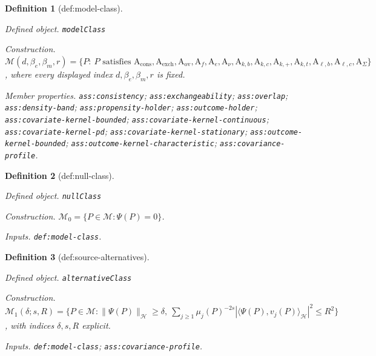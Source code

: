 \documentclass{article}
\newtheorem{definition}{Definition}
\begin{document}
\begin{definition}[def:model-class]\label{def:model-class}
\par\smallskip\noindent\emph{Defined object.} \texttt{modelClass}
\par\smallskip\noindent\emph{Construction.} \(\mathcal M(d,\beta_e,\beta_m,r)=\{P:\ P\text{ satisfies }\mathrm{A}_{\mathrm{cons}},\mathrm{A}_{\mathrm{exch}},\mathrm{A}_{\mathrm{ov}},\mathrm{A}_{f},\mathrm{A}_{e},\mathrm{A}_{\nu},\mathrm{A}_{k,b},\mathrm{A}_{k,c},\mathrm{A}_{k,+},\mathrm{A}_{k,t},\mathrm{A}_{\ell,b},\mathrm{A}_{\ell,c},\mathrm{A}_{\Sigma}\}\), where every displayed index \(d,\beta_e,\beta_m,r\) is fixed.
\par\smallskip\noindent\emph{Member properties.} \texttt{ass:\allowbreak{}consistency}; \texttt{ass:\allowbreak{}exchangeability}; \texttt{ass:\allowbreak{}overlap}; \texttt{ass:\allowbreak{}density-\allowbreak{}band}; \texttt{ass:\allowbreak{}propensity-\allowbreak{}holder}; \texttt{ass:\allowbreak{}outcome-\allowbreak{}holder}; \texttt{ass:\allowbreak{}covariate-\allowbreak{}kernel-\allowbreak{}bounded}; \texttt{ass:\allowbreak{}covariate-\allowbreak{}kernel-\allowbreak{}continuous}; \texttt{ass:\allowbreak{}covariate-\allowbreak{}kernel-\allowbreak{}pd}; \texttt{ass:\allowbreak{}covariate-\allowbreak{}kernel-\allowbreak{}stationary}; \texttt{ass:\allowbreak{}outcome-\allowbreak{}kernel-\allowbreak{}bounded}; \texttt{ass:\allowbreak{}outcome-\allowbreak{}kernel-\allowbreak{}characteristic}; \texttt{ass:\allowbreak{}covariance-\allowbreak{}profile}.
\end{definition}

\begin{definition}[def:null-class]\label{def:null-class}
\par\smallskip\noindent\emph{Defined object.} \texttt{nullClass}
\par\smallskip\noindent\emph{Construction.} \(\mathcal M_0=\{P\in\mathcal M:\Psi(P)=0\}\).
\par\smallskip\noindent\emph{Inputs.} \texttt{def:\allowbreak{}model-\allowbreak{}class}.
\end{definition}

\begin{definition}[def:source-alternatives]\label{def:source-alternatives}
\par\smallskip\noindent\emph{Defined object.} \texttt{alternativeClass}
\par\smallskip\noindent\emph{Construction.} \(\mathcal M_1(\delta;s,R)=\{P\in\mathcal M:\|\Psi(P)\|_{\mathcal H}\ge\delta,\ \sum_{j\ge1}\mu_j(P)^{-2s}|\langle\Psi(P),v_j(P)\rangle_{\mathcal H}|^2\le R^2\}\), with indices \(\delta,s,R\) explicit.
\par\smallskip\noindent\emph{Inputs.} \texttt{def:\allowbreak{}model-\allowbreak{}class}; \texttt{ass:\allowbreak{}covariance-\allowbreak{}profile}.
\end{definition}
\end{document}
